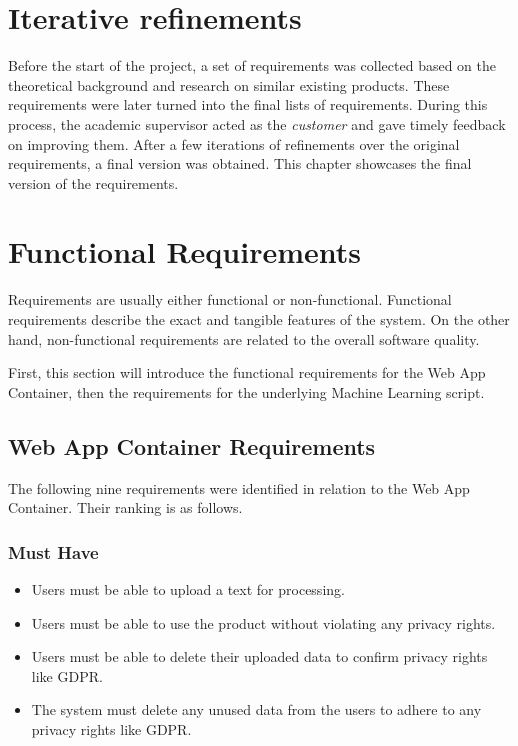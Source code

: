\documentclass{l4proj}
\begin{document}
\section{Iterative refinements}
Before the start of the project, a set of requirements was collected based on the theoretical background and research on similar existing products. These requirements were later turned into the final lists of requirements. During this process, the academic supervisor acted as the \textit{customer} and gave timely feedback on improving them. After a few iterations of refinements over the original requirements, a final version was obtained. This chapter showcases the final version of the requirements.

\section{Functional Requirements}
Requirements are usually either functional or non-functional. Functional requirements describe the exact and tangible features of the system. On the other hand, non-functional requirements are related to the overall software quality. 

First, this section will introduce the functional requirements for the Web App Container, then the requirements for the underlying Machine Learning script.
\subsection{Web App Container Requirements}
The following nine requirements were identified in relation to the Web App Container. Their ranking is as follows.
\subsubsection{Must Have}
\begin{itemize}
\item
Users must be able to upload a text for processing.
\item
Users must be able to use the product without violating any privacy rights.
\item
Users must be able to delete their uploaded data to confirm privacy rights like GDPR.
\item
The system must delete any unused data from the users to adhere to any privacy rights like GDPR.
\end{itemize}
\end{document}
